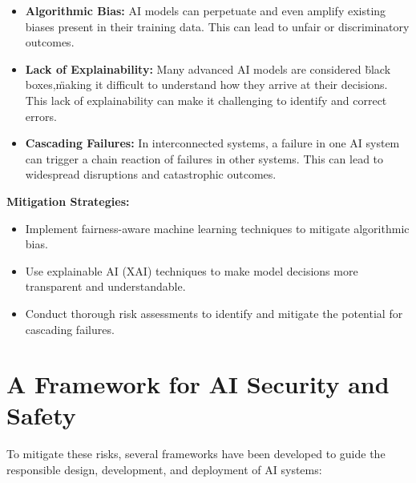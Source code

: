 \begin{itemize}
    \item \textbf{Algorithmic Bias:} AI models can perpetuate and even amplify existing biases present in their training data. This can lead to unfair or discriminatory outcomes.
    \item \textbf{Lack of Explainability:} Many advanced AI models are considered \"black boxes,\" making it difficult to understand how they arrive at their decisions. This lack of explainability can make it challenging to identify and correct errors.
    \item \textbf{Cascading Failures:} In interconnected systems, a failure in one AI system can trigger a chain reaction of failures in other systems. This can lead to widespread disruptions and catastrophic outcomes.
\end{itemize}

\begin{tipbox}
    \textbf{Mitigation Strategies:}
    \begin{itemize}
        \item Implement fairness-aware machine learning techniques to mitigate algorithmic bias.
        \item Use explainable AI (XAI) techniques to make model decisions more transparent and understandable.
        \item Conduct thorough risk assessments to identify and mitigate the potential for cascading failures.
    \end{itemize}
\end{tipbox}

\section{A Framework for AI Security and Safety}
\label{sec:security_framework}
To mitigate these risks, several frameworks have been developed to guide the responsible design, development, and deployment of AI systems:

